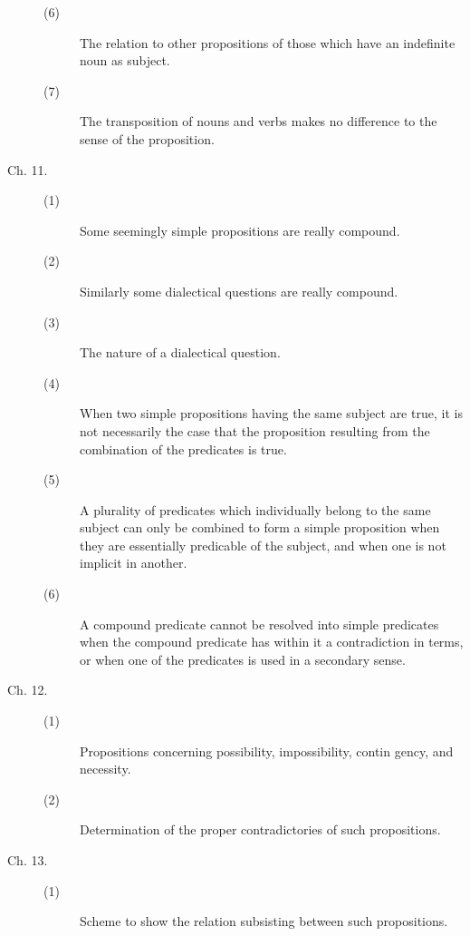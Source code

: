 \begin{description}
\begin{description}
\item[(6)] The relation to other propositions of those which have an indefinite noun as subject. 

\item[(7)] The transposition of nouns and verbs makes no difference to the 
sense of the proposition. 

\end{description}

\item[Ch. 11.]

\begin{description}
 \item[(1)] Some seemingly simple propositions are really compound. 

\item[(2)] Similarly some dialectical questions are really compound. 

\item[(3)] The nature of a dialectical question. 

\item[(4)] When two simple propositions having the same subject are true, 
it is not necessarily the case that the proposition resulting from 
the combination of the predicates is true. 

\item[(5)] A plurality of predicates which individually belong to the same 
subject can only be combined to form a simple proposition when 
they are essentially predicable of the subject, and when one is 
not implicit in another. 

\item[(6)] A compound predicate cannot be resolved into simple predicates 
when the compound predicate has within it a contradiction in 
terms, or when one of the predicates is used in a secondary sense. 
\end{description}

\item[Ch. 12.]
\begin{description}
 \item[(1)] Propositions concerning possibility, impossibility, contin 
gency, and necessity. 
\item[(2)] Determination of the proper contradictories of such propositions. 
\end{description}

\item[Ch. 13.]
\begin{description}
 \item[(1)] Scheme to show the relation subsisting between such 
propositions. 


\end{description}
\end{description}
